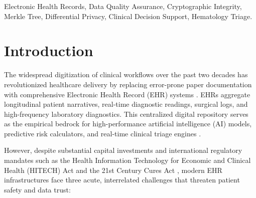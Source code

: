 \documentclass[conference]{IEEEtran}
\begin{document}
\begin{IEEEkeywords}
Electronic Health Records, Data Quality Assurance, Cryptographic Integrity, Merkle Tree, Differential Privacy, Clinical Decision Support, Hematology Triage.
\end{IEEEkeywords}

\section{Introduction}
\label{sec:intro}
The widespread digitization of clinical workflows over the past two decades has revolutionized healthcare delivery by replacing error-prone paper documentation with comprehensive Electronic Health Record (EHR) systems \cite{hersh2013caveats}. EHRs aggregate longitudinal patient narratives, real-time diagnostic readings, surgical logs, and high-frequency laboratory diagnostics. This centralized digital repository serves as the empirical bedrock for high-performance artificial intelligence (AI) models, predictive risk calculators, and real-time clinical triage engines \cite{topol2019high, rajkomar2018scalable}. 

However, despite substantial capital investments and international regulatory mandates such as the Health Information Technology for Economic and Clinical Health (HITECH) Act and the 21st Century Cures Act \cite{sarpatwari2018using}, modern EHR infrastructures face three acute, interrelated challenges that threaten patient safety and data trust:
\end{document}
